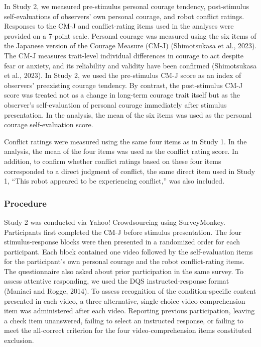 \documentclass[utf8]{FrontiersinHarvard}
\begin{document}
In Study 2, we measured pre-stimulus personal courage tendency, post-stimulus self-evaluations of observers' own personal courage, and robot conflict ratings. Responses to the CM-J and conflict-rating items used in the analyses were provided on a 7-point scale. Personal courage was measured using the six items of the Japanese version of the Courage Measure (CM-J) (Shimotsukasa et al., 2023). The CM-J measures trait-level individual differences in courage to act despite fear or anxiety, and its reliability and validity have been confirmed (Shimotsukasa et al., 2023). In Study 2, we used the pre-stimulus CM-J score as an index of observers' preexisting courage tendency. By contrast, the post-stimulus CM-J score was treated not as a change in long-term courage trait itself but as the observer's self-evaluation of personal courage immediately after stimulus presentation. In the analysis, the mean of the six items was used as the personal courage self-evaluation score.

Conflict ratings were measured using the same four items as in Study 1. In the analysis, the mean of the four items was used as the conflict rating score. In addition, to confirm whether conflict ratings based on these four items corresponded to a direct judgment of conflict, the same direct item used in Study 1, ``This robot appeared to be experiencing conflict,'' was also included.

\subsubsection{Procedure}\label{procedure-1}

Study 2 was conducted via Yahoo! Crowdsourcing using SurveyMonkey. Participants first completed the CM-J before stimulus presentation. The four stimulus-response blocks were then presented in a randomized order for each participant. Each block contained one video followed by the self-evaluation items for the participant's own personal courage and the robot conflict-rating items. The questionnaire also asked about prior participation in the same survey. To assess attentive responding, we used the DQS instructed-response format (Maniaci and Rogge, 2014). To assess recognition of the condition-specific content presented in each video, a three-alternative, single-choice video-comprehension item was administered after each video. Reporting previous participation, leaving a check item unanswered, failing to select an instructed response, or failing to meet the all-correct criterion for the four video-comprehension items constituted exclusion.
\end{document}
